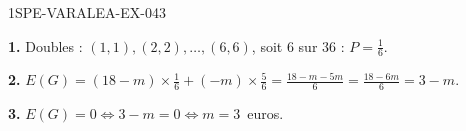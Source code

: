 \begin{corrige}{1SPE-VARALEA-EX-043}

\textbf{1.} Doubles : $(1,1),(2,2),\ldots,(6,6)$, soit $6$ sur $36$ : $P = \frac{1}{6}$.

\medskip
\textbf{2.} $E(G) = (18-m) \times \frac{1}{6} + (-m) \times \frac{5}{6} = \frac{18-m-5m}{6} = \frac{18-6m}{6} = 3-m$.

\medskip
\textbf{3.} $E(G) = 0 \Leftrightarrow 3 - m = 0 \Leftrightarrow m = 3$~euros.

\end{corrige}

